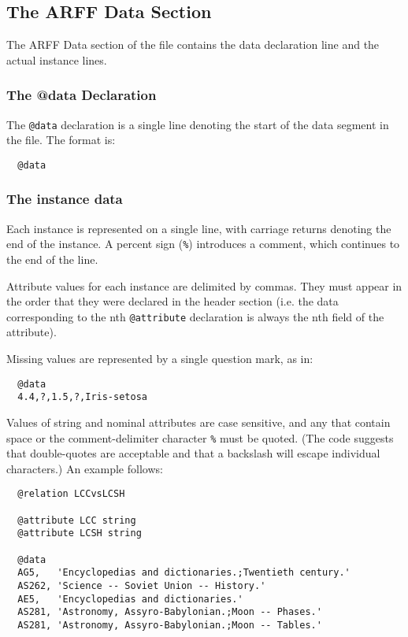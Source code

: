\subsection{The ARFF Data Section}
The ARFF Data section of the file contains the data declaration line and the actual instance lines.


\subsubsection*{The @data Declaration}
The \texttt{@data} declaration is a single line denoting the start of the data segment in the file. The format is:

\begin{verbatim}
  @data
\end{verbatim}


\subsubsection*{The instance data}
Each instance is represented on a single line, with carriage returns denoting the end of the instance. A percent sign (\texttt{\%}) introduces a comment, which continues to the end of the line.

Attribute values for each instance are delimited by commas. They must appear in the order that they were declared in the header section (i.e. the data corresponding to the nth \texttt{@attribute} declaration is always the nth field of the attribute).

Missing values are represented by a single question mark, as in:

\begin{verbatim}
  @data
  4.4,?,1.5,?,Iris-setosa
\end{verbatim}

\noindent Values of string and nominal attributes are case sensitive, and any that contain space or the comment-delimiter character \texttt{\%} must be quoted. (The code suggests that double-quotes are acceptable and that a backslash will escape individual characters.) An example follows:

\begin{verbatim}
  @relation LCCvsLCSH

  @attribute LCC string
  @attribute LCSH string

  @data
  AG5,   'Encyclopedias and dictionaries.;Twentieth century.'
  AS262, 'Science -- Soviet Union -- History.'
  AE5,   'Encyclopedias and dictionaries.'
  AS281, 'Astronomy, Assyro-Babylonian.;Moon -- Phases.'
  AS281, 'Astronomy, Assyro-Babylonian.;Moon -- Tables.'
\end{verbatim}


